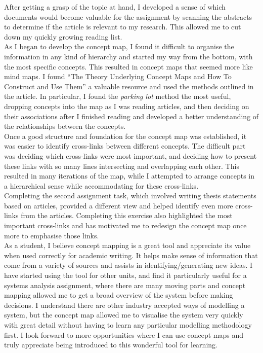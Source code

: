 \documentclass[12pt,a4paper]{report}
\begin{document}
After getting a grasp of the topic at hand, I developed a sense of which documents would become valuable for the assignment by scanning the abstracts to determine if the article is relevant to my research. This allowed me to cut down my quickly growing reading list.\\

As I began to develop the concept map, I found it difficult to organise the information in any kind of hierarchy and started my way from the bottom, with the most specific concepts. This resulted in concept maps that seemed more like mind maps. I found \citet{Novak2006} ``The Theory Underlying Concept Maps and How To Construct and Use Them'' a valuable resource and used the methods outlined in the article. In particular, I found the \emph{parking lot} method the most useful, dropping concepts into the map as I was reading articles, and then deciding on their associations after I finished reading and developed a better understanding of the relationships between the concepts.\\

Once a good structure and foundation for the concept map was established, it was easier to identify cross-links between different concepts. The difficult part was deciding which cross-links were most important, and deciding how to present these links with so many lines intersecting and overlapping each other. This resulted in many iterations of the map, while I attempted to arrange concepts in a hierarchical sense while accommodating for these cross-links.\\

Completing the second assignment task, which involved writing thesis statements based on articles, provided a different view and helped identify even more cross-links from the articles. Completing this exercise also highlighted the most important cross-links and has motivated me to redesign the concept map once more to emphasise those links.\\

As a student, I believe concept mapping is a great tool and appreciate its value when used correctly for academic writing. It helps make sense of information that come from a variety of sources and assists in identifying/generating new ideas. I have started using the tool for other units, and find it particularly useful for a systems analysis assignment, where there are many moving parts and concept mapping allowed me to get a broad overview of the system before making decisions. I understand there are other industry accepted ways of modelling a system, but the concept map allowed me to visualise the system very quickly with great detail without having to learn any particular modelling methodology first. I look forward to more opportunities where I can use concept maps and truly appreciate being introduced to this wonderful tool for learning.

\newpage
{}


\end{document}
